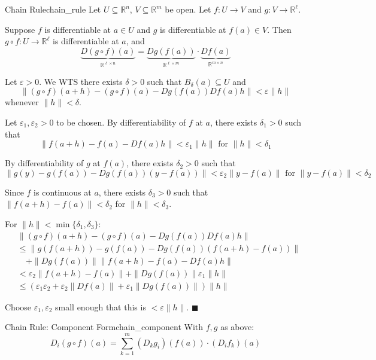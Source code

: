 \documentclass[11pt, letterpaper, openany]{book}
\renewenvironment{proof}[1][\proofname]{%
  \tcolorbox[blanker, breakable, left=1em,
    before skip=1em, after skip=1em,
    borderline west={2pt}{0pt}{MagicTeal!50},
    colback=MagicCream,
    before upper={\textcolor{MagicTeal}{\sffamily\bfseries #1.}\space}
  ]%
}{%
  \hfill\textcolor{MagicTeal}{\ensuremath{\blacksquare}}\endtcolorbox%
}
\begin{document}
\begin{thm}{Chain Rule}{chain_rule}
Let $U \subseteq \mathbb{R}^n$, $V \subseteq \mathbb{R}^m$ be open. Let $f: U \to V$ and $g: V \to \mathbb{R}^\ell$.

Suppose $f$ is differentiable at $a \in U$ and $g$ is differentiable at $f(a) \in V$. Then $g \circ f: U \to \mathbb{R}^\ell$ is differentiable at $a$, and
\[\underbrace{D(g \circ f)(a)}_{\mathbb{R}^{\ell \times n}} = \underbrace{Dg(f(a))}_{\mathbb{R}^{\ell \times m}} \cdot \underbrace{Df(a)}_{\mathbb{R}^{m \times n}}\]
\end{thm}

\begin{proof}
Let $\varepsilon > 0$. We WTS there exists $\delta > 0$ such that $B_\delta(a) \subseteq U$ and
\[\|(g \circ f)(a+h) - (g \circ f)(a) - Dg(f(a)) Df(a) h\| < \varepsilon \|h\|\]
whenever $\|h\| < \delta$.

Let $\varepsilon_1, \varepsilon_2 > 0$ to be chosen. By differentiability of $f$ at $a$, there exists $\delta_1 > 0$ such that
\[\|f(a+h) - f(a) - Df(a) h\| < \varepsilon_1 \|h\| \text{ for } \|h\| < \delta_1\]

By differentiability of $g$ at $f(a)$, there exists $\delta_2 > 0$ such that
\[\|g(y) - g(f(a)) - Dg(f(a))(y - f(a))\| < \varepsilon_2 \|y - f(a)\| \text{ for } \|y - f(a)\| < \delta_2\]

Since $f$ is continuous at $a$, there exists $\delta_3 > 0$ such that $\|f(a+h) - f(a)\| < \delta_2$ for $\|h\| < \delta_3$.

For $\|h\| < \min\{\delta_1, \delta_3\}$:
\begin{align*}
&\|(g \circ f)(a+h) - (g \circ f)(a) - Dg(f(a)) Df(a) h\| \\
&\leq \|g(f(a+h)) - g(f(a)) - Dg(f(a))(f(a+h) - f(a))\| \\
&\quad + \|Dg(f(a))\| \|f(a+h) - f(a) - Df(a) h\| \\
&< \varepsilon_2 \|f(a+h) - f(a)\| + \|Dg(f(a))\| \varepsilon_1 \|h\| \\
&\leq (\varepsilon_1 \varepsilon_2 + \varepsilon_2 \|Df(a)\| + \varepsilon_1 \|Dg(f(a))\|) \|h\|
\end{align*}

Choose $\varepsilon_1, \varepsilon_2$ small enough that this is $< \varepsilon \|h\|$.
\end{proof}

\begin{thm}{Chain Rule: Component Form}{chain_component}
With $f, g$ as above:
\[D_i(g \circ f)(a) = \sum_{k=1}^m (D_k g_i)(f(a)) \cdot (D_i f_k)(a)\]
\end{thm}
\end{document}
